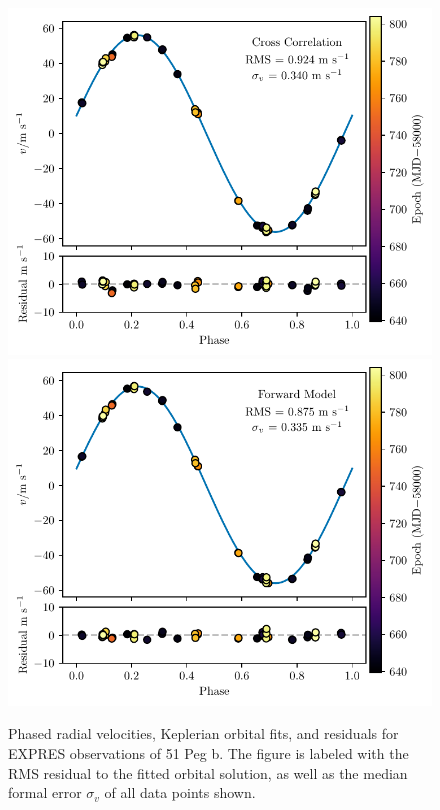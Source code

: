 \begin{figure}[htbp]
    \centering
    \includegraphics{figures-4/217014_ccf.pdf}
    \includegraphics{figures-4/217014_cbc.pdf}
    \caption[51 Peg b -- radial velocities and Keplerian orbital fits]{Phased radial velocities, Keplerian orbital fits, and residuals for EXPRES observations of 51 Peg b. The figure is labeled with the RMS residual to the fitted orbital solution, as well as the median formal error $\sigma_v$ of all data points shown.}
    \label{fig:217014}
\end{figure}

